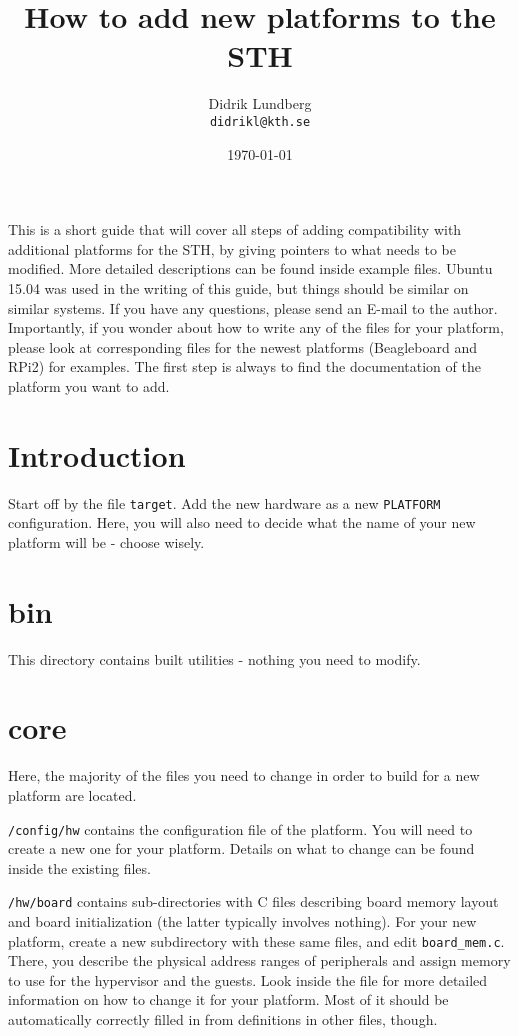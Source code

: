 \documentclass[a4paper,11pt,reqno]{amsart}
\title{How to add new platforms to the STH}
\author{Didrik Lundberg\\
\texttt{didrikl@kth.se}}
\date{\today}
\begin{document}
\maketitle
\noindent
This is a short guide that will cover all steps of adding compatibility with additional platforms for the STH, by giving pointers to what needs to be modified. More detailed descriptions can be found inside example files. Ubuntu 15.04 was used in the writing of this guide, but things should be similar on similar systems. If you have any questions, please send an E-mail to the author. Importantly, if you wonder about how to write any of the files for your platform, please look at corresponding files for the newest platforms (Beagleboard and RPi2) for examples. The first step is always to find the documentation of the platform you want to add.

\section{Introduction}
\noindent
Start off by the file \texttt{target}. Add the new hardware as a new \texttt{PLATFORM} configuration. Here, you will also need to decide what the name of your new platform will be - choose wisely.

\section{bin}
\noindent
This directory contains built utilities - nothing you need to modify.

\section{core}
\noindent
Here, the majority of the files you need to change in order to build for a new platform are located.

\texttt{/config/hw} contains the configuration file of the platform. You will need to create a new one for your platform. Details on what to change can be found inside the existing files.

\texttt{/hw/board} contains sub-directories with C files describing board memory layout and board initialization (the latter typically involves nothing). For your new platform, create a new subdirectory with these same files, and edit \texttt{board\_mem.c}. There, you describe the physical address ranges of peripherals and assign memory to use for the hypervisor and the guests. Look inside the file for more detailed information on how to change it for your platform. Most of it should be automatically correctly filled in from definitions in other files, though.
\end{document}
